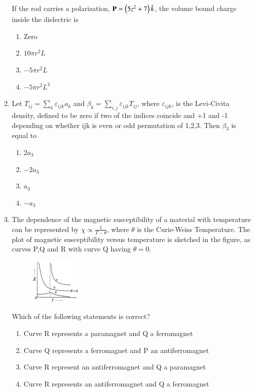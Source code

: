 \documentclass[journal]{IEEEtran}
\numberwithin{equation}{enumi}
\numberwithin{figure}{enumi}
\begin{document}
\begin{enumerate}[start=25]
If the rod carries a polarization, $\mathbf{P}=\left(5z^2+7\right)\hat{k}$, the volume bound charge inside the dielectric is 
    \begin{enumerate}
    	\item Zero
    	\item $10\pi r^2 L$
    	\item $-5\pi r^2 L$
    	\item $-5\pi r^2 L^2$
    \end{enumerate}
    \item Let $T_{ij}=\sum_{k}\varepsilon_{ijk}a_{k}$ and $\beta_{k}=\sum_{i,j}\varepsilon_{ijk}T_{ij}$, where $\varepsilon_{ijk}$, is the Levi-Civita density, defined to be zero if two of the indices coincide and +1 and -1 depending on whether ijk is even or odd permutation of 1,2,3. Then $\beta_{3}$ is equal to
    \begin{enumerate}
    	\item $2a_3$
    	\item $-2a_3$
    	\item $a_3$
    	\item $-a_3$
    \end{enumerate}
    \item The dependence of the magnetic susceptibility \brak{\chi} of a material with temperature  can be represented by $\chi\propto\frac{1}{T-\theta}$, where $\theta$ is the Curie-Weiss Temperature. The plot of magnetic susceptibility versus temperature is sketched in the figure, as curves P,Q and R with curve Q having $\theta=0$.\\
    \begin{figure}[!ht]
    \centering
    \includegraphics[width=2.5cm]{figs/Q27.png}
    \end{figure}
    \newpage
     Which of the following statements is correct?
    \begin{enumerate}
   	\item Curve R represents a paramagnet and Q a ferromagnet
   	\item Curve Q represents a ferromagnet and P an antiferromagnet
   	\item Curve R represent an antiferromagnet and Q a paramagnet
   	\item Curve R represents an antiferromagnet and Q a ferromagnet
   \end{enumerate}
   

\end{enumerate}
\end{document}
